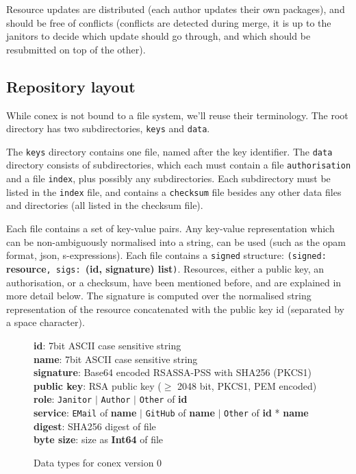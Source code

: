 \documentclass[nocopyrightspace]{sigplanconf}
\begin{document}
Resource updates are distributed (each author updates their own packages), and should be free of conflicts (conflicts are detected during merge, it is up to the janitors to decide which update should go through, and which should be resubmitted on top of the other).

\subsection{Repository layout}
While conex is not bound to a file system, we'll reuse their terminology.
The root directory has two subdirectories, \texttt{keys} and \texttt{data}.

The \texttt{keys} directory contains one file, named after the key identifier.
The \texttt{data} directory consists of subdirectories, which each must contain a file \texttt{authorisation} and a file \texttt{index}, plus possibly any subdirectories.
Each subdirectory must be listed in the \texttt{index} file, and contains a \texttt{checksum} file besides any other data files and directories (all listed in the checksum file).

Each file contains a set of key-value pairs.
Any key-value representation which can be non-ambiguously normalised into a string, can be used (such as the opam format, json, s-expressions).
Each file contains a \texttt{signed} structure: \texttt{(signed: }\textbf{resource}\texttt{, sigs: }\textbf{(id, signature) list}\texttt{)}.
Resources, either a public key, an authorisation, or a checksum, have been mentioned before, and are explained in more detail below.
The signature is computed over the normalised string representation of the resource concatenated with the public key id (separated by a space character).

\begin{figure}
\textbf{id}: 7bit ASCII case sensitive string\\
\textbf{name}: 7bit ASCII case sensitive string\\
\textbf{signature}: Base64 encoded RSASSA-PSS with SHA256 (PKCS1)\\
\textbf{public key}: RSA public key ($\geq$ 2048 bit, PKCS1, PEM encoded)\\
\textbf{role}: \texttt{Janitor} $|$ \texttt{Author} $|$ \texttt{Other} of \textbf{id}\\
\textbf{service}: \texttt{EMail} of \textbf{name} $|$ \texttt{GitHub} of \textbf{name} $|$ \texttt{Other} of \textbf{id} * \textbf{name}\\
\textbf{digest}: SHA256 digest of file\\
\textbf{byte size}: size as \textbf{Int64} of file
\caption{\label{fig:datatypes0}
  Data types for conex version 0}
\end{figure}
\end{document}
